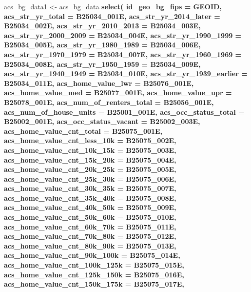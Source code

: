 \documentclass[]{book}
\newenvironment{Shaded}{\begin{snugshade}}{\end{snugshade}}
\newcommand{\KeywordTok}[1]{\textcolor[rgb]{0.13,0.29,0.53}{\textbf{#1}}}
\newcommand{\DataTypeTok}[1]{\textcolor[rgb]{0.13,0.29,0.53}{#1}}
\newcommand{\StringTok}[1]{\textcolor[rgb]{0.31,0.60,0.02}{#1}}
\newcommand{\OperatorTok}[1]{\textcolor[rgb]{0.81,0.36,0.00}{\textbf{#1}}}
\newcommand{\NormalTok}[1]{#1}
\theoremstyle{definition}
\theoremstyle{definition}
\theoremstyle{definition}
\theoremstyle{remark}
\begin{document}
\begin{Shaded}
\begin{Highlighting}[]
{\NormalTok{acs_bg_data1 <-}\StringTok{ }\NormalTok{acs_bg_data }\OperatorTok{%
\StringTok{  }\KeywordTok{select}\NormalTok{(}
    \DataTypeTok{id_geo_bg_fips =}\NormalTok{ GEOID,}
    \DataTypeTok{acs_str_yr_total =}\NormalTok{ B25034_001E,}
    \DataTypeTok{acs_str_yr_2014_later =}\NormalTok{ B25034_002E,}
    \DataTypeTok{acs_str_yr_2010_2013 =}\NormalTok{ B25034_003E,}
    \DataTypeTok{acs_str_yr_2000_2009 =}\NormalTok{ B25034_004E,}
    \DataTypeTok{acs_str_yr_1990_1999 =}\NormalTok{ B25034_005E,}
    \DataTypeTok{acs_str_yr_1980_1989 =}\NormalTok{ B25034_006E,}
    \DataTypeTok{acs_str_yr_1970_1979 =}\NormalTok{ B25034_007E,}
    \DataTypeTok{acs_str_yr_1960_1969 =}\NormalTok{ B25034_008E,}
    \DataTypeTok{acs_str_yr_1950_1959 =}\NormalTok{ B25034_009E,}
    \DataTypeTok{acs_str_yr_1940_1949 =}\NormalTok{ B25034_010E,}
    \DataTypeTok{acs_str_yr_1939_earlier =}\NormalTok{ B25034_011E,}
    \DataTypeTok{acs_home_value_lwr =}\NormalTok{ B25076_001E,}
    \DataTypeTok{acs_home_value_med =}\NormalTok{ B25077_001E,}
    \DataTypeTok{acs_home_value_upr =}\NormalTok{ B25078_001E,}
    \DataTypeTok{acs_num_of_renters_total =}\NormalTok{ B25056_001E,}
    \DataTypeTok{acs_num_of_house_units =}\NormalTok{ B25001_001E,}
    \DataTypeTok{acs_occ_status_total =}\NormalTok{ B25002_001E,}
    \DataTypeTok{acs_occ_status_vacant =}\NormalTok{ B25002_003E,}
    \DataTypeTok{acs_home_value_cnt_total =}\NormalTok{ B25075_001E,}
    \DataTypeTok{acs_home_value_cnt_less_10k =}\NormalTok{ B25075_002E,}
    \DataTypeTok{acs_home_value_cnt_10k_15k =}\NormalTok{ B25075_003E,}
    \DataTypeTok{acs_home_value_cnt_15k_20k =}\NormalTok{ B25075_004E,}
    \DataTypeTok{acs_home_value_cnt_20k_25k =}\NormalTok{ B25075_005E,}
    \DataTypeTok{acs_home_value_cnt_25k_30k =}\NormalTok{ B25075_006E,}
    \DataTypeTok{acs_home_value_cnt_30k_35k =}\NormalTok{ B25075_007E,}
    \DataTypeTok{acs_home_value_cnt_35k_40k =}\NormalTok{ B25075_008E,}
    \DataTypeTok{acs_home_value_cnt_40k_50k =}\NormalTok{ B25075_009E,}
    \DataTypeTok{acs_home_value_cnt_50k_60k =}\NormalTok{ B25075_010E,}
    \DataTypeTok{acs_home_value_cnt_60k_70k =}\NormalTok{ B25075_011E,}
    \DataTypeTok{acs_home_value_cnt_70k_80k =}\NormalTok{ B25075_012E,}
    \DataTypeTok{acs_home_value_cnt_80k_90k =}\NormalTok{ B25075_013E,}
    \DataTypeTok{acs_home_value_cnt_90k_100k =}\NormalTok{ B25075_014E,}
    \DataTypeTok{acs_home_value_cnt_100k_125k =}\NormalTok{ B25075_015E,}
    \DataTypeTok{acs_home_value_cnt_125k_150k =}\NormalTok{ B25075_016E,}
    \DataTypeTok{acs_home_value_cnt_150k_175k =}\NormalTok{ B25075_017E,}
}}
\end{Highlighting}
\end{Shaded}
\end{document}
